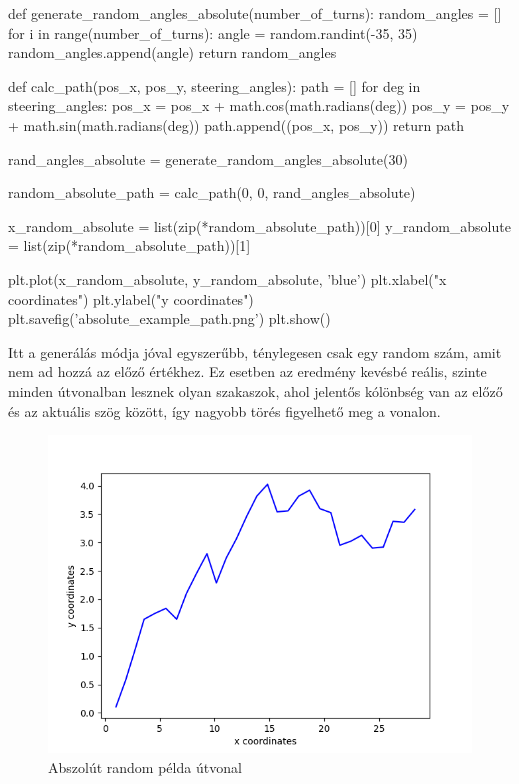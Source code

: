 \begin{python}
def generate_random_angles_absolute(number_of_turns):
    random_angles = []
    for i in range(number_of_turns):
        angle = random.randint(-35, 35)
        random_angles.append(angle)
    return random_angles
    
def calc_path(pos_x, pos_y, steering_angles):
    path = []
    for deg in steering_angles:
        pos_x = pos_x + math.cos(math.radians(deg))
        pos_y = pos_y + math.sin(math.radians(deg))
        path.append((pos_x, pos_y))
    return path
    
rand_angles_absolute = generate_random_angles_absolute(30)

random_absolute_path = calc_path(0, 0, rand_angles_absolute)

x_random_absolute = list(zip(*random_absolute_path))[0]
y_random_absolute = list(zip(*random_absolute_path))[1]

plt.plot(x_random_absolute, y_random_absolute, 'blue')
plt.xlabel("x coordinates")
plt.ylabel("y coordinates")
plt.savefig('absolute_example_path.png')
plt.show()
\end{python}
Itt a generálás módja jóval egyszerűbb, ténylegesen csak egy random szám, amit nem ad hozzá az előző értékhez. Ez esetben az eredmény kevésbé reális, szinte minden útvonalban lesznek olyan szakaszok, ahol jelentős kólönbség van az előző és az aktuális szög között, így nagyobb törés figyelhető meg a vonalon.

\begin{figure}[h!]
\centering
\includegraphics[scale=0.75]{images/absolute_example_path.png}
\caption{Abszolút random példa útvonal}
\label{fig:absolute_path}
\end{figure}

